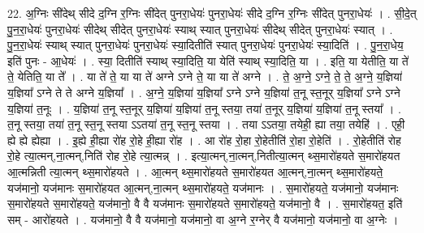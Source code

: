 \documentclass[17pt]{extarticle}
\begin{document}
22. अ॒ग्निः सी॑देथ् सीदे द॒ग्नि र॒ग्निः सी॑देत् पुनरा॒धेयः॑ पुनरा॒धेयः॑ सीदे द॒ग्नि र॒ग्निः सी॑देत् पुनरा॒धेयः॑ । . सी॒दे॒त् पु॒न॒रा॒धेयः॑ पुनरा॒धेयः॑ सीदेथ् सीदेत् पुनरा॒धेयः॑ स्याथ् स्यात् पुनरा॒धेयः॑ सीदेथ् सीदेत् पुनरा॒धेयः॑ स्यात् । . पु॒न॒रा॒धेयः॑ स्याथ् स्यात् पुनरा॒धेयः॑ पुनरा॒धेयः॑ स्या॒दितीति॑ स्यात् पुनरा॒धेयः॑ पुनरा॒धेयः॑ स्या॒दिति॑ । . पु॒न॒रा॒धेय॒ इति॑ पुनः - आ॒धेयः॑ । . स्या॒ दितीति॑ स्याथ् स्या॒दिति॒ या येति॑ स्याथ् स्या॒दिति॒ या । . इति॒ या येतीति॒ या ते॑ ते॒ येतिति॒ या ते᳚ । . या ते॑ ते॒ या या ते॑ अग्ने ऽग्ने ते॒ या या ते॑ अग्ने । . ते॒ अ॒ग्ने॒ ऽग्ने॒ ते॒ ते॒ अ॒ग्ने॒ य॒ज्ञिया॑ य॒ज्ञिया᳚ ऽग्ने ते ते अग्ने य॒ज्ञिया᳚ । . अ॒ग्ने॒ य॒ज्ञिया॑ य॒ज्ञिया᳚ ऽग्ने ऽग्ने य॒ज्ञिया॑ त॒नू स्त॒नूर् य॒ज्ञिया᳚ ऽग्ने ऽग्ने य॒ज्ञिया॑ त॒नूः । . य॒ज्ञिया॑ त॒नू स्त॒नूर् य॒ज्ञिया॑ य॒ज्ञिया॑ त॒नू स्तया॒ तया॑ त॒नूर् य॒ज्ञिया॑ य॒ज्ञिया॑ त॒नू स्तया᳚ । . त॒नू स्तया॒ तया॑ त॒नू स्त॒नू स्तया ऽऽतया॑ त॒नू स्त॒नू स्तया । . तया ऽऽतया॒ तयेही॒ ह्या तया॒ तयेहि॑ । . एही॒ ह्ये ह्ये ह्येह्या । . इ॒ह्ये ही॒ह्या रो॑ह रो॒हे ही॒ह्या रो॑ह । . आ रो॑ह रो॒हा रो॒हेतीति॑ रो॒हा रो॒हेति॑ । . रो॒हेतीति॑ रोह रो॒हे त्या॒त्मन्,ना॒त्मन्,निति॑ रोह रो॒हे त्या॒त्मन्न् । . इत्या॒त्मन्,ना॒त्मन्,नितीत्या॒त्मन् थ्स॒मारो॑हयते स॒मारो॑हयत आ॒त्मन्निती त्या॒त्मन् थ्स॒मारो॑हयते । . आ॒त्मन् थ्स॒मारो॑हयते स॒मारो॑हयत आ॒त्मन्,ना॒त्मन् थ्स॒मारो॑हयते॒ यज॑मानो॒ यज॑मानः स॒मारो॑हयत आ॒त्मन्,ना॒त्मन् थ्स॒मारो॑हयते॒ यज॑मानः । . स॒मारो॑हयते॒ यज॑मानो॒ यज॑मानः स॒मारो॑हयते स॒मारो॑हयते॒ यज॑मानो॒ वै वै यज॑मानः स॒मारो॑हयते स॒मारो॑हयते॒ यज॑मानो॒ वै । . स॒मारो॑हयत॒ इति॑ सम् - आरो॑हयते । . यज॑मानो॒ वै वै यज॑मानो॒ यज॑मानो॒ वा अ॒ग्ने र॒ग्नेर् वै यज॑मानो॒ यज॑मानो॒ वा अ॒ग्नेः । \newline
\end{document}
